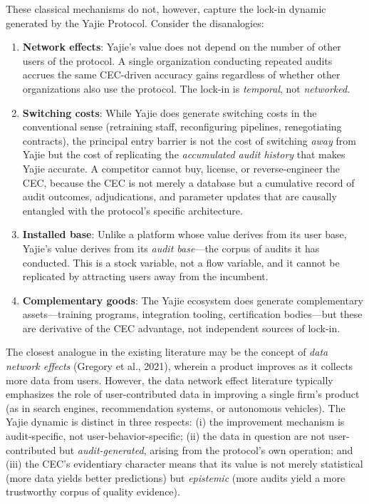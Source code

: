 \documentclass[12pt,a4paper]{ctexart}
\theoremstyle{definition}
\theoremstyle{remark}
\begin{document}
These classical mechanisms do not, however, capture the lock-in dynamic generated by the Yajie Protocol. Consider the disanalogies:

\begin{enumerate}[label=\arabic*.]
\item \textbf{Network effects}: Yajie's value does not depend on the number of other users of the protocol. A single organization conducting repeated audits accrues the same CEC-driven accuracy gains regardless of whether other organizations also use the protocol. The lock-in is \textit{temporal}, not \textit{networked}.

\item \textbf{Switching costs}: While Yajie does generate switching costs in the conventional sense (retraining staff, reconfiguring pipelines, renegotiating contracts), the principal entry barrier is not the cost of switching \textit{away} from Yajie but the cost of replicating the \textit{accumulated audit history} that makes Yajie accurate. A competitor cannot buy, license, or reverse-engineer the CEC, because the CEC is not merely a database but a cumulative record of audit outcomes, adjudications, and parameter updates that are causally entangled with the protocol's specific architecture.

\item \textbf{Installed base}: Unlike a platform whose value derives from its user base, Yajie's value derives from its \textit{audit base}—the corpus of audits it has conducted. This is a stock variable, not a flow variable, and it cannot be replicated by attracting users away from the incumbent.

\item \textbf{Complementary goods}: The Yajie ecosystem does generate complementary assets—training programs, integration tooling, certification bodies—but these are derivative of the CEC advantage, not independent sources of lock-in.
\end{enumerate}

The closest analogue in the existing literature may be the concept of \textit{data network effects} (Gregory et al., 2021), wherein a product improves as it collects more data from users. However, the data network effect literature typically emphasizes the role of user-contributed data in improving a single firm's product (as in search engines, recommendation systems, or autonomous vehicles). The Yajie dynamic is distinct in three respects: (i) the improvement mechanism is audit-specific, not user-behavior-specific; (ii) the data in question are not user-contributed but \textit{audit-generated}, arising from the protocol's own operation; and (iii) the CEC's evidentiary character means that its value is not merely statistical (more data yields better predictions) but \textit{epistemic} (more audits yield a more trustworthy corpus of quality evidence).
\end{document}
